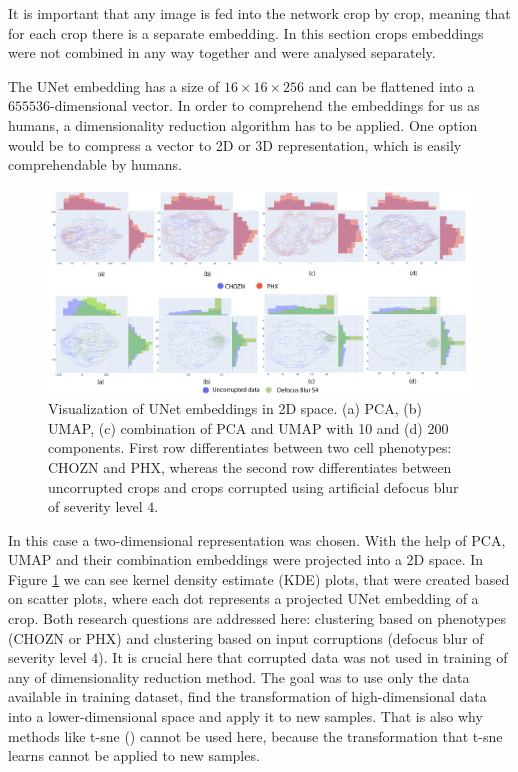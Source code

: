 It is important that any image is fed into the network crop by crop, meaning that for each crop there is a separate embedding. In this section crops embeddings were not combined in any way together and were analysed separately.

The UNet embedding has a size of $16 \times 16 \times 256$ and can be flattened into a $655536$-dimensional vector. In order to comprehend the embeddings for us as humans, a dimensionality reduction algorithm has to be applied. One option would be to compress a vector to 2D or 3D representation, which is easily comprehendable by humans.
\begin{figure}[htb]
	\includegraphics[width=\linewidth]{bilder/unet-embeddings/umap-pca-embeddings.png}
	\caption[Visualization of UNet embeddings in 2D space]%
	{Visualization of UNet embeddings in 2D space. (a) PCA, (b) UMAP, (c) combination of PCA and UMAP with 10 and (d) 200 components. First row differentiates between two cell phenotypes: CHOZN and PHX, whereas the second row differentiates between uncorrupted crops and crops corrupted using artificial defocus blur of severity level $4$.}\label{fig:umap-pca-embeddings}
\end{figure}

In this case a two-dimensional representation was chosen. With the help of PCA, UMAP and their combination embeddings were projected into a 2D space. In Figure \ref{fig:umap-pca-embeddings} we can see kernel density estimate (KDE) plots, that were created based on scatter plots, where each dot represents a projected UNet embedding of a crop. Both research questions are addressed here: clustering based on phenotypes (CHOZN or PHX) and clustering based on input corruptions (defocus blur of severity level $4$). It is crucial here that corrupted data was not used in training of any of dimensionality reduction method. The goal was to use only the data available in training dataset, find the transformation of high-dimensional data into a lower-dimensional space and apply it to new samples. That is also why methods like t-sne (\cite{t-sne}) cannot be used here, because the transformation that t-sne learns cannot be applied to new samples. 

